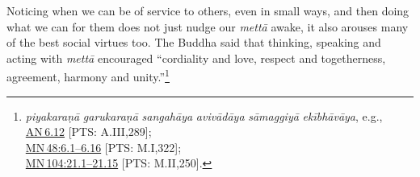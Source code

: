 \documentclass[10pt, openright]{book}
\begin{document}
Noticing when we can be of service to others, even in small ways, and then doing what we can for them does not just nudge our \textit{mettā} awake, it also arouses many of the best social virtues too. The Buddha said that thinking, speaking and acting with \textit{mettā} encouraged “cordiality and love, respect and togetherness, agreement, harmony and unity.”\footnote {\textit{piyakaraṇā} \textit{garukaraṇā} \textit{sangahāya} \textit{avivādāya} \textit{sāmaggiyā} \textit{ekībhāvāya}, e.g.,\\
\href{https://suttacentral.net/an6.12/en/sujato}{AN 6.12} [PTS: A.III,289];\\
\href{https://suttacentral.net/mn48/en/sujato\#6.1}{MN 48:6.1–6.16} [PTS: M.I,322];\\
\href{https://suttacentral.net/mn104/en/sujato\#21.1}{MN 104:21.1–21.15} [PTS: M.II,250].}
\end{document}
